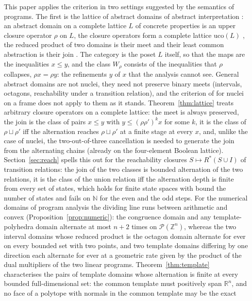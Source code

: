 \documentclass[11pt]{amsart}
\theoremstyle{definition}
\newcommand{\uco}{\mathrm{uco}}
\newcommand{\cP}{\mathcal P}
\begin{document}
This paper applies the criterion in two settings suggested by the
semantics of programs. The first is the lattice of abstract domains of
abstract interpretation \cite{CC79}: an abstract domain on a complete
lattice $L$ of concrete properties is an upper closure operator
$\rho$ on $L$, the closure operators form a complete lattice
$\uco(L)$ \cite{Ward}, the reduced product of two domains is their meet
and their least common abstraction is their join \cite{GR97}. The
category is the poset $L$ itself, so that the maps are the inequalities
$x\le y$, and the class $W_\rho$ consists of the inequalities that $\rho$
collapses, $\rho x=\rho y$: the refinements $y$ of $x$ that the analysis
cannot see. General abstract domains are not nuclei, they need not
preserve binary meets (intervals, octagons, reachability under a
transition relation), and the criterion of \cite{Fijoin} for nuclei on a
frame does not apply to them as it stands. Theorem~\ref{thm:lattice}
treats arbitrary closure operators on a complete lattice: the meet is
always preserved, the join is the class of pairs $x\le y$ with $y\le
(\rho\rho')^kx$ for some $k$, it is the class of $\rho\sqcup\rho'$ iff the
alternation reaches $\rho\sqcup\rho'$ at a finite stage at every $x$,
and, unlike the case of nuclei, the two-out-of-three cancellation is
needed to generate the join from the alternating chains (already on the
four-element Boolean lattice). Section~\ref{sec:reach} spells this out for
the reachability closures $S\mapsto R^*(S\cup I)$ of transition relations:
the join of the two classes is bounded alternation of the two relations,
it is the class of the union relation iff the alternation depth is
finite from every set of states, which holds for finite state spaces with
bound the number of states and fails on $\mathbb N$ for the even and the
odd steps. For the numerical domains of program analysis the dividing
line runs between arithmetic and convex (Proposition~\ref{prop:numeric}):
the congruence domain and any template-polyhedra domain alternate at
most $n+2$ times on $\cP(\mathbb Z^n)$, whereas the two interval domains
whose reduced product is the octagon domain alternate for ever on every
bounded set with two points, and two template domains differing by one
direction each alternate for ever at a geometric rate given by the
product of the dual multipliers of the two linear programs.
Theorem~\ref{thm:template} characterises the pairs of template domains
whose alternation is finite at every bounded full-dimensional set: the
common template must positively span $\mathbb R^n$, and no face of a
polytope with normals in the common template may be the exact
\end{document}
